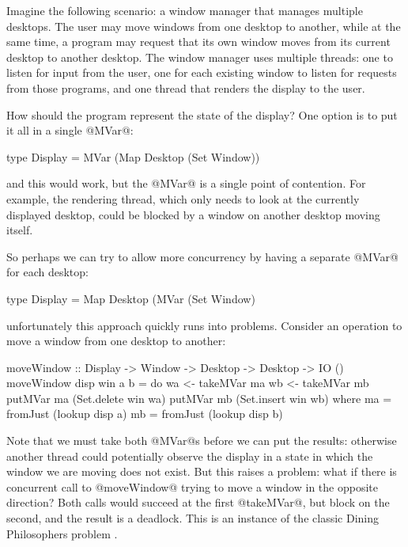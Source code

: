 Imagine the following scenario: a window manager that manages multiple
desktops.  The user may move windows from one desktop to another,
while at the same time, a program may request that its own window
moves from its current desktop to another desktop.  The window manager
uses multiple threads: one to listen for input from the user, one for
each existing window to listen for requests from those programs, and
one thread that renders the display to the user.

How should the program represent the state of the display?  One option
is to put it all in a single @MVar@:

\begin{haskell}
type Display = MVar (Map Desktop (Set Window))
\end{haskell}

\noindent and this would work, but the @MVar@ is a single point of
contention.  For example, the rendering thread, which only needs to
look at the currently displayed desktop, could be blocked by a window
on another desktop moving itself.

So perhaps we can try to allow more concurrency by having a separate
@MVar@ for each desktop:

\begin{haskell}
type Display = Map Desktop (MVar (Set Window)
\end{haskell}

\noindent unfortunately this approach quickly runs into problems.
Consider an operation to move a window from one desktop to another:

\begin{haskell}
moveWindow :: Display -> Window -> Desktop -> Desktop -> IO ()
moveWindow disp win a b = do
  wa <- takeMVar ma
  wb <- takeMVar mb
  putMVar ma (Set.delete win wa)
  putMVar mb (Set.insert win wb)
 where
  ma = fromJust (lookup disp a)
  mb = fromJust (lookup disp b)
\end{haskell}

\noindent Note that we must take both @MVar@s before we can put the
results: otherwise another thread could potentially observe the
display in a state in which the window we are moving does not exist.
But this raises a problem: what if there is concurrent call to
@moveWindow@ trying to move a window in the opposite direction?  Both
calls would succeed at the first @takeMVar@, but block on the second,
and the result is a deadlock.  This is an instance of the classic
Dining Philosophers problem \cite{}.

